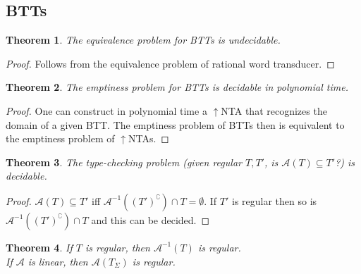 \documentclass{article}
\newtheorem{theorem}{Theorem}[section]
\begin{document}
\subsection{BTTs}
\begin{theorem}
	The equivalence problem for BTTs is undecidable.
\end{theorem}
\begin{proof}
	Follows from the equivalence problem of rational word transducer.
\end{proof}

\begin{theorem}
	The emptiness problem for BTTs is decidable in polynomial time.
\end{theorem}
\begin{proof}
	One can construct in polynomial time a $\uparrow$NTA that recognizes the domain of a given BTT. The emptiness problem of BTTs then is equivalent to the emptiness problem of $\uparrow$NTAs.
\end{proof}

\begin{theorem}
	The type-checking problem (given regular $T, T'$, is $\mathcal{A}(T) \subseteq T'$?) is decidable.
\end{theorem}
\begin{proof}
	$\mathcal{A}(T) \subseteq T'$ iff $\mathcal{A}^{-1}((T')^\complement) \cap T = \emptyset$. If $T'$ is regular then so is $\mathcal{A}^{-1}((T')^\complement) \cap T$ and this can be decided.
\end{proof}

\begin{theorem}
	If $T$ is regular, then $\mathcal{A}^{-1}(T)$ is regular. \\
	If $\mathcal{A}$ is linear, then $\mathcal{A}(T_\Sigma)$ is regular.
\end{theorem}
\end{document}
